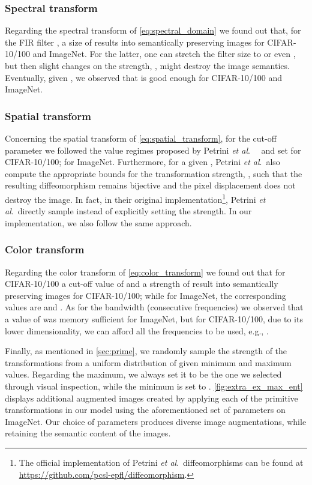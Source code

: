 \documentclass[runningheads]{llncs}
\def\etal{\emph{et al}.~}
\begin{document}
\subsubsection{Spectral transform}
Regarding the spectral transform of \cref{eq:spectral_domain} we found out that, for the FIR filter , a size of  results into semantically preserving images for CIFAR-10/100 and ImageNet. For the latter, one can stretch the filter size to  or even , but then slight changes on the strength, , might destroy the image semantics. Eventually, given , we observed that  is good enough for CIFAR-10/100 and ImageNet. 

\subsubsection{Spatial transform}
Concerning the spatial transform of \cref{eq:spatial_transform}, for the cut-off parameter  we followed the value regimes proposed by Petrini \etal~\cite{diffeo} and set  for CIFAR-10/100;  for ImageNet. Furthermore, for a given , Petrini \etal also compute the appropriate bounds for the transformation strength, , such that the resulting diffeomorphism remains bijective and the pixel displacement does not destroy the image. In fact, in their original implementation\footnote{The official implementation of Petrini \etal diffeomorphisms can be found at \url{https://github.com/pcsl-epfl/diffeomorphism}.}, Petrini \etal directly sample  instead of explicitly setting the strength. In our implementation, we also follow the same approach. 

\subsubsection{Color transform}
Regarding the color transform of \cref{eq:color_transform} we found out that for CIFAR-10/100 a cut-off value of  and a strength of  result into semantically preserving images for CIFAR-10/100; while for ImageNet, the corresponding values are  and . As for the bandwidth (consecutive frequencies)  we observed that a value of  was memory sufficient for ImageNet, but for CIFAR-10/100, due to its lower dimensionality, we can afford all the frequencies to be used, e.g., . 

\bigskip\medskip\noindent
Finally, as mentioned in \cref{sec:prime}, we randomly sample the strength of the transformations  from a uniform distribution of given minimum and maximum values. Regarding the maximum, we always set it to be the one we selected through visual inspection, while the minimum is set to . \cref{fig:extra_ex_max_ent} displays additional augmented images created by applying each of the primitive transformations in our model using the aforementioned set of parameters on ImageNet. Our choice of parameters produces diverse image augmentations, while retaining the semantic content of the images.
\end{document}
